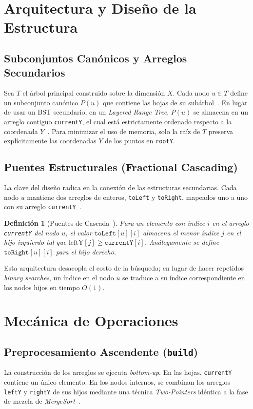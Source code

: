 \documentclass[10pt,twocolumn,a4paper]{article}
\newtheorem{definition}{Definición}
\begin{document}
\section{Arquitectura y Diseño de la Estructura}

\subsection{Subconjuntos Canónicos y Arreglos Secundarios}
Sea $T$ el árbol principal construido sobre la dimensión $X$. Cada nodo $u \in T$ define un subconjunto canónico $P(u)$ que contiene las hojas de su subárbol~\cite{deberg}. En lugar de usar un BST secundario, en un \textit{Layered Range Tree}, $P(u)$ se almacena en un arreglo contiguo \texttt{currentY}, el cual está estrictamente ordenado respecto a la coordenada $Y$~\cite{doc, deberg}. Para minimizar el uso de memoria, solo la raíz de $T$ preserva explícitamente las coordenadas $Y$ de los puntos en \texttt{rootY}.

\subsection{Puentes Estructurales (Fractional Cascading)}
La clave del diseño radica en la conexión de las estructuras secundarias. Cada nodo $u$ mantiene dos arreglos de enteros, \texttt{toLeft} y \texttt{toRight}, mapeados uno a uno con su arreglo \texttt{currentY}~\cite{doc}.

\begin{definition}[Puentes de Cascada~\cite{deberg}]
Para un elemento con índice $i$ en el arreglo \texttt{currentY} del nodo $u$, el valor $\texttt{toLeft}[u][i]$ almacena el menor índice $j$ en el hijo izquierdo tal que $\text{leftY}[j] \ge \texttt{currentY}[i]$. Análogamente se define $\texttt{toRight}[u][i]$ para el hijo derecho.
\end{definition}

Esta arquitectura desacopla el costo de la búsqueda; en lugar de hacer repetidos \textit{binary searches}, un índice en el nodo $u$ se traduce a su índice correspondiente en los nodos hijos en tiempo $O(1)$.

\section{Mecánica de Operaciones}

\subsection{Preprocesamiento Ascendente (\texttt{build})}
La construcción de los arreglos se ejecuta \textit{bottom-up}. En las hojas, \texttt{currentY} contiene un único elemento. En los nodos internos, se combinan los arreglos \texttt{leftY} y \texttt{rightY} de sus hijos mediante una técnica \textit{Two-Pointers} idéntica a la fase de mezcla de \textit{MergeSort}~\cite{doc}. 
\end{document}
